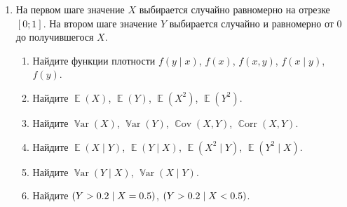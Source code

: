 \documentclass[12pt]{article}
\DeclareMathOperator{\Cov}{\mathbb{C}ov}
\DeclareMathOperator{\Corr}{\mathbb{C}orr}
\DeclareMathOperator{\Var}{\mathbb{V}ar}
\let\P\relax
\DeclareMathOperator{\P}{\mathbb{P}}
\DeclareMathOperator{\E}{\mathbb{E}}
\begin{document}
\begin{enumerate}[resume]
\item  На первом шаге значение $X$ выбирается случайно равномерно на отрезке $[0;1]$. 
На втором шаге значение $Y$ выбирается случайно и равномерно от $0$ до получившегося $X$.

\begin{enumerate}
\item Найдите функции плотности $f(y \mid x)$, $f(x)$, $f(x,y)$, $f(x \mid y)$, $f(y)$.
\item Найдите $\E(X)$, $\E(Y)$, $\E(X^2)$, $\E(Y^2)$.
\item Найдите $\Var(X)$, $\Var(Y)$, $\Cov(X,Y)$, $\Corr(X,Y)$.
\item Найдите $\E(X \mid Y)$, $\E(Y \mid X)$, $\E(X^2 \mid Y)$, $\E(Y^2 \mid X)$.
\item Найдите $\Var(Y \mid X)$, $\Var(X \mid Y)$.
\item Найдите $\P(Y>0.2 \mid X=0.5)$, $\P(Y>0.2 \mid X<0.5)$.
\end{enumerate}

\end{enumerate}
\end{document}
